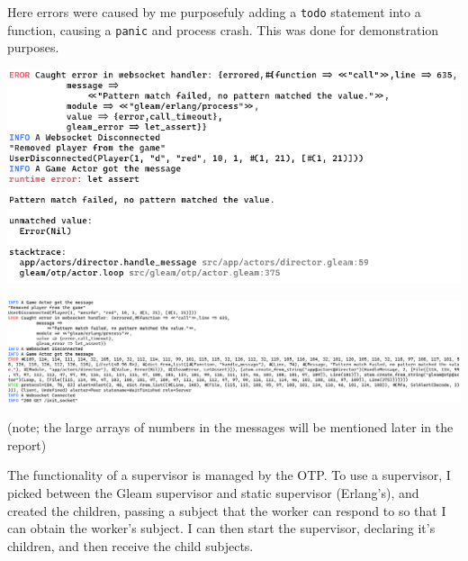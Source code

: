 \documentclass[]{final}
\begin{document}
Here errors were caused by me purposefuly adding a \lstinline|todo| statement
into a function, causing a \lstinline|panic| and process crash. This was done
for demonstration purposes.

\label{ascii}

\noindent
\begin{minipage}[t]{18em}
  \includegraphics[width=\linewidth]{panic_without_supervisor.png}
  \label{fig: 21}
\end{minipage}
\hfill
\begin{minipage}[t]{20em}
  \includegraphics[width=\linewidth]{panic_with_supervisor.png}
  \label{fig: 22}

  (note; the large arrays of numbers in the messages will be mentioned later in
  the report)
\end{minipage}

The functionality of a supervisor is managed by the OTP. To use a supervisor,
I picked between the Gleam supervisor and static supervisor (Erlang's),
and created the children, passing a subject that the worker can respond to
so that I can obtain the worker's subject. I can then start the supervisor,
declaring it's children, and then receive the child subjects.
\end{document}
